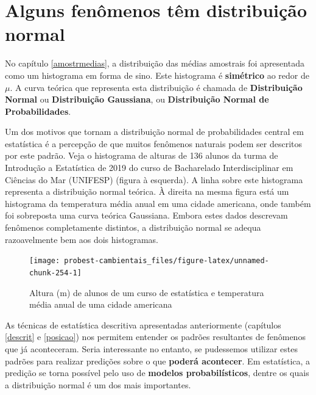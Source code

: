 \documentclass[
]{book}
\begin{document}
\hypertarget{normdist}{%
\chapter{Alguns fenômenos têm distribuição normal}\label{normdist}}

No capítulo \ref{amostrmedias}, a distribuição das médias amostrais foi apresentada como um histograma em forma de sino. Este histograma é \textbf{simétrico} ao redor de \(\mu\). A curva teórica que representa esta distribuição é chamada de \textbf{Distribuição Normal} ou \textbf{Distribuição Gaussiana}, ou \textbf{Distribuição Normal de Probabilidades}.

Um dos motivos que tornam a distribuição normal de probabilidades central em estatística é a percepção de que muitos fenômenos naturais podem ser descritos por este padrão. Veja o histograma de alturas de 136 alunos da turma de Introdução a Estatística de 2019 do curso de Bacharelado Interdisciplinar em Ciências do Mar (UNIFESP) (figura à esquerda). A linha sobre este histograma representa a distribuição normal teórica. À direita na mesma figura está um histograma da temperatura média anual em uma cidade americana, onde também foi sobreposta uma curva teórica Gaussiana. Embora estes dados descrevam fenômenos completamente distintos, a distribuição normal se adequa razoavelmente bem aos dois histogramas.

\begin{figure}

{\centering \texttt{[image: probest-cambientais\_files/figure-latex/unnamed-chunk-254-1]} 

}

\caption{Altura (m) de alunos de um curso de estatística e temperatura média anual de uma cidade americana}\label{fig:unnamed-chunk-254}
\end{figure}

As técnicas de estatística descritiva apresentadas anteriormente (capítulos \ref{descrit} e \ref{posicao}) nos permitem entender os padrões resultantes de fenômenos que já aconteceram. Seria interessante no entanto, se pudessemos utilizar estes padrões para realizar predições sobre o que \textbf{poderá acontecer}. Em estatística, a predição se torna possível pelo uso de \textbf{modelos probabilísticos}, dentre os quais a distribuição normal é um dos mais importantes.
\end{document}
